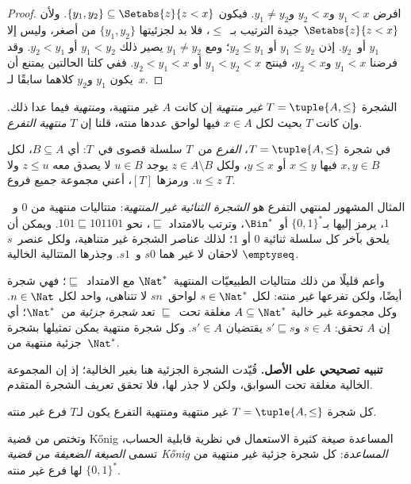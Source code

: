 \documentclass[../../../include/open-logic-section]{subfiles}
\begin{document}
\begin{proof}
افرض $y_1 < x$ و$y_2 < x$ و$y_1 \neq y_2$. فيكون
$\{y_1, y_2\} \subseteq \Setabs{z}{z<x}$. ولأن
$\Setabs{z}{z<x}$ جيدة الترتيب بـ~$\le$، فلا بد لجزئيتها
$\{y_1, y_2\}$ من أصغر، وليس إلا $y_1$ أو~$y_2$.
إذن $y_1 \le y_2$ أو $y_2 \le y_1$؛ ومع $y_1 \neq y_2$
يصير ذلك $y_1 < y_2$ أو $y_2 < y_1$. وقد فرضنا
$y_1 < x$ و$y_2 < x$، فينتج $y_1 < y_2 < x$ أو $y_2 < y_1 < x$.
ففي كلتا الحالتين يمتنع أن يكون $y_1$ و$y_2$ كلاهما سابقًا لـ~$x$.
\end{proof}

\begin{defn}
الشجرة $T = \tuple{A, \le}$ \emph{غير منتهية} إن كانت $A$ غير
منتهية، و\emph{منتهية} فيما عدا ذلك. وإن كانت $T$ بحيث لكل $x \in A$ فيها
لواحق عددها منته، قلنا إن $T$ \emph{منتهية التفرع}.
\end{defn}

\begin{defn}[الفروع]
في شجرة $T = \tuple{A, \le}$، \emph{الفرع} من~$T$ سلسلة قصوى في~$T$:
أي $B \subseteq A$، لكل $x, y \in B$ فيها $x \le y$ أو $y \le x$،
ولكل $z \in A \setminus B$ يوجد $u \in B$ لا يصدق معه $z \le u$
ولا $u \le z$.
%
ورمزها $[T]$، أعني مجموعة جميع فروع $T$.
\end{defn}

\begin{ex}
المثال المشهور لمنتهي التفرع هو \emph{الشجرة الثنائية غير المنتهية}:
متتاليات منتهية من $0$ و~$1$، يرمز إليها بـ$\{0,1\}^*$ أو~$\Bin^*$،
وترتب بالامتداد $\sqsubseteq$، نحو $101 \sqsubseteq 101101$.
ويمكن أن يلحق بآخر كل سلسلة ثنائية $0$ أو $1$؛ لذلك عناصر الشجرة
غير متناهية، ولكل عنصر~$s$ لاحقان لا غير هما $s0$ و~$s1$.
وجذرها المتتالية الخالية $\emptyseq$.
\end{ex}

\begin{ex}
وأعم قليلًا من ذلك متتاليات الطبيعيّات المنتهية~$\Nat^*$ مع
الامتداد~$\sqsubseteq$؛ فهي شجرة أيضًا، ولكن تفرعها غير منته:
لكل $s \in \Nat^*$ لواحق~$sn$ لا تتناهى، واحد لكل $n \in \Nat$.
وكل مجموعة غير خالية $A \subseteq \Nat^*$ مغلقة تحت~$\sqsubseteq$ تعد
\emph{شجرة جزئية} من~$\Nat^*$؛ أي إن $A$ تحقق: $s \in A$ و$s' \sqsubseteq s$
يقتضيان $s' \in A$. وكل شجرة منتهية يمكن تمثيلها بشجرة جزئية
منتهية من~$\Nat^*$.
\end{ex}

\textbf{تنبيه تصحيحي على الأصل.} قُيّدت الشجرة الجزئية هنا بغير الخالية؛
إذ إن المجموعة الخالية مغلقة تحت السوابق، ولكن لا جذر لها، فلا تحقق تعريف
الشجرة المتقدم.

\begin{prop}
كل شجرة $T = \tuple{A,\le}$ غير منتهية ومنتهية التفرع يكون لـ$T$ فرع غير منته.
\end{prop}

وتختص من قضية \foreignlanguage{english}{K\H{o}nig} المساعدة
صيغة كثيرة الاستعمال في نظرية قابلية الحساب، تسمى
\emph{الصيغة الضعيفة من قضية \foreignlanguage{english}{K\H{o}nig} المساعدة}:
كل شجرة جزئية غير منتهية من $\{0,1\}^*$ لها فرع غير منته.
\end{document}
